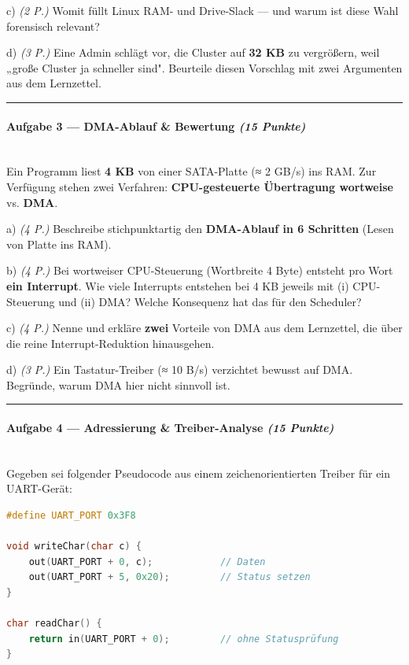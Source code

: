 \documentclass[11pt, a4paper]{article}
\begin{document}
c) \textit{(2 P.)} Womit füllt Linux RAM- und Drive-Slack — und warum ist diese Wahl forensisch relevant?


d) \textit{(3 P.)} Eine Admin schlägt vor, die Cluster auf \textbf{32 KB} zu vergrößern, weil „große Cluster ja schneller sind". Beurteile diesen Vorschlag mit zwei Argumenten aus dem Lernzettel.



\noindent\textcolor{rulegray}{\rule{\linewidth}{0.4pt}}


\paragraph{Aufgabe 3 — DMA-Ablauf \& Bewertung \textit{(15 Punkte)}}\mbox{}\\[2pt]

Ein Programm liest \textbf{4 KB} von einer SATA-Platte (≈ 2 GB/s) ins RAM. Zur Verfügung stehen zwei Verfahren: \textbf{CPU-gesteuerte Übertragung wortweise} vs. \textbf{DMA}.


a) \textit{(4 P.)} Beschreibe stichpunktartig den \textbf{DMA-Ablauf in 6 Schritten} (Lesen von Platte ins RAM).


b) \textit{(4 P.)} Bei wortweiser CPU-Steuerung (Wortbreite 4 Byte) entsteht pro Wort \textbf{ein Interrupt}. Wie viele Interrupts entstehen bei 4 KB jeweils mit (i) CPU-Steuerung und (ii) DMA? Welche Konsequenz hat das für den Scheduler?


c) \textit{(4 P.)} Nenne und erkläre \textbf{zwei} Vorteile von DMA aus dem Lernzettel, die über die reine Interrupt-Reduktion hinausgehen.


d) \textit{(3 P.)} Ein Tastatur-Treiber (≈ 10 B/s) verzichtet bewusst auf DMA. Begründe, warum DMA hier nicht sinnvoll ist.



\noindent\textcolor{rulegray}{\rule{\linewidth}{0.4pt}}


\paragraph{Aufgabe 4 — Adressierung \& Treiber-Analyse \textit{(15 Punkte)}}\mbox{}\\[2pt]

Gegeben sei folgender Pseudocode aus einem zeichenorientierten Treiber für ein UART-Gerät:


\begin{lstlisting}[language=c]
#define UART_PORT 0x3F8

void writeChar(char c) {
    out(UART_PORT + 0, c);            // Daten
    out(UART_PORT + 5, 0x20);         // Status setzen
}

char readChar() {
    return in(UART_PORT + 0);         // ohne Statusprüfung
}
\end{lstlisting}
\end{document}
